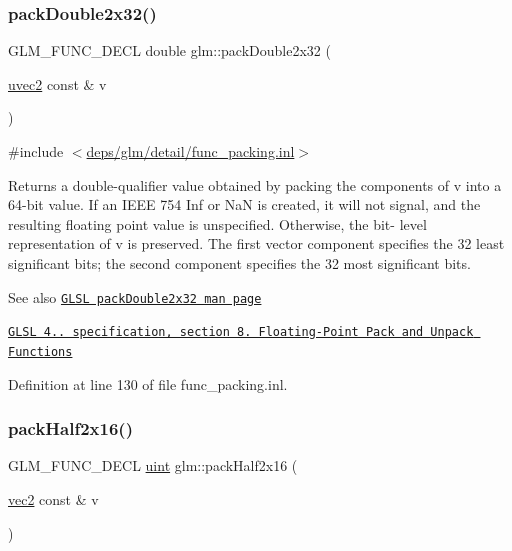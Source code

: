 \subsubsection{\texorpdfstring{pack\+Double2x32()}{packDouble2x32()}}
{\footnotesize\ttfamily G\+L\+M\+\_\+\+F\+U\+N\+C\+\_\+\+D\+E\+CL double glm\+::pack\+Double2x32 (\begin{DoxyParamCaption}\item[{\hyperlink{group__core__types_gafd2041b45eff671aa8899d2c2835eee9}{uvec2} const \&}]{v }\end{DoxyParamCaption})}



{\ttfamily \#include $<$\hyperlink{func__packing_8inl}{deps/glm/detail/func\+\_\+packing.\+inl}$>$}

Returns a double-\/qualifier value obtained by packing the components of v into a 64-\/bit value. If an I\+E\+EE 754 Inf or NaN is created, it will not signal, and the resulting floating point value is unspecified. Otherwise, the bit-\/ level representation of v is preserved. The first vector component specifies the 32 least significant bits; the second component specifies the 32 most significant bits.

\begin{DoxySeeAlso}{See also}
\href{http://www.opengl.org/sdk/docs/manglsl/xhtml/packDouble2x32.xml}{\tt G\+L\+SL pack\+Double2x32 man page} 

\href{http://www.opengl.org/registry/doc/GLSLangSpec.4.20.8.pdf}{\tt G\+L\+SL 4.. specification, section 8. Floating-\/\+Point Pack and Unpack Functions} 
\end{DoxySeeAlso}


Definition at line 130 of file func\+\_\+packing.\+inl.

\mbox{\label{group__core__func__packing_ga20f134b07db3a3d3a38efb2617388c92}} 
\subsubsection{\texorpdfstring{pack\+Half2x16()}{packHalf2x16()}}
{\footnotesize\ttfamily G\+L\+M\+\_\+\+F\+U\+N\+C\+\_\+\+D\+E\+CL \hyperlink{group__core__precision_ga4fd29415871152bfb5abd588334147c8}{uint} glm\+::pack\+Half2x16 (\begin{DoxyParamCaption}\item[{\hyperlink{group__core__types_gaa1618f51db67eaa145db101d8c8431d8}{vec2} const \&}]{v }\end{DoxyParamCaption})}



